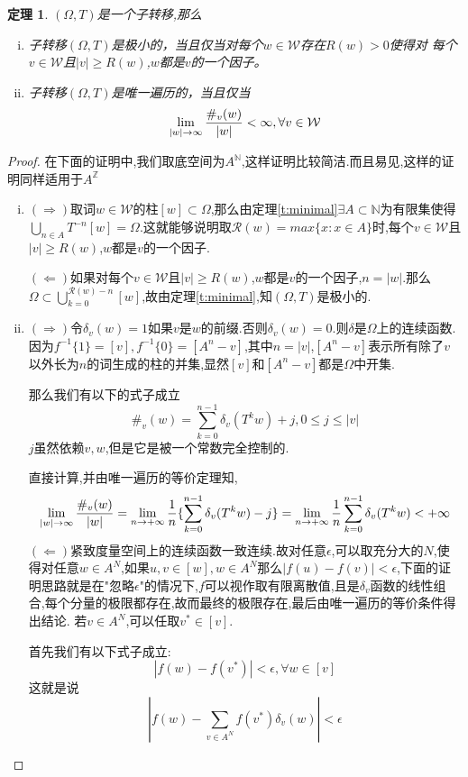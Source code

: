 \documentclass[a4paper,11pt,oneside]{book}
\newtheorem{theorem}{\textbf{\hspace{0.7cm}定理}}[section]
\begin{document}
\begin{theorem}
\label{t:subshift}
$(\Omega,T)$是一个子转移,那么
\begin{enumerate}[(i)]
\item 子转移$(\Omega,T)$是极小的，当且仅当对每个$w\in \mathcal{W}$存在$R(w)>0$使得对%
每个$v\in \mathcal{W}$且$|v|\geq R(w)$,$w$都是$v$的一个因子。
\item 子转移$(\Omega,T)$是唯一遍历的，当且仅当$$\lim_{|w| \to \infty}{\#_v(w)\over |w |}<\infty, \forall v\in \mathcal{W}$$
\end{enumerate}
\end{theorem}
\begin{proof}
在下面的证明中,我们取底空间为$A^{\mathbb{N}}$,这样证明比较简洁.而且易见,这样的证明同样适用于$A^{\mathbb{Z}}$
\begin{enumerate}[(i)]
\item $(\Rightarrow)$取词$w\in\mathcal{W}$的柱$[w]\subset \Omega$,那么由定理\ref{t:minimal}$\exists A\subset\mathbb{N}$为有限集使得$\bigcup_{n\in A} T^{-n}[w]=\Omega$.这就能够说明取$\mathcal{R}(w)=max\{x:x\in A\}$时,每个$v\in \mathcal{W}$且$|v|\geq R(w)$,$w$都是$v$的一个因子.

$(\Leftarrow)$如果对每个$v\in \mathcal{W}$且$|v|\geq R(w)$,$w$都是$v$的一个因子,$n=|w|$.那么$\Omega\subset \bigcup_{k=0}^{\mathcal{R}(w)-n}[w]$,故由定理\ref{t:minimal},知$(\Omega,T)$是极小的.
\item $(\Rightarrow)$令$\delta_v(w)=1$如果$v$是$w$的前缀.否则$\delta_v(w)=0$.则$\delta$是$\Omega$上的连续函数.因为$f^{-1}\{1\}=[v],f^{-1}\{0\}=[A^{n}-v]$,其中$n=|v|$,$[A^{n}-v]$表示所有除了$v$以外长为$n$的词生成的柱的并集,显然$[v]$和$[A^{n}-v]$都是$\Omega$中开集.

那么我们有以下的式子成立$$\#_v(w)=\sum_{k=0}^{n-1}\delta_v(T^kw)+j,0\leq j\leq |v|$$
$j$虽然依赖$v,w$,但是它是被一个常数完全控制的.

直接计算,并由唯一遍历的等价定理知,
$$
\lim_{|w| \to \infty}{\#_v(w)\over |w |}=\lim_{n\to +\infty}\frac{1}{n}\{\sum_{k=0}^{n-1}\delta_v(T^kw)-j\}=\lim_{n\to +\infty}\frac{1}{n}\sum_{k=0}^{n-1}\delta_v(T^kw)<+\infty
$$
$(\Leftarrow)$紧致度量空间上的连续函数一致连续.故对任意$\epsilon$,可以取充分大的$N$,使得对任意$w\in A^{N}$,如果$u,v\in [w],w\in A^{N}$那么$|f(u)-f(v)|<\epsilon$,下面的证明思路就是在"忽略$\epsilon$"的情况下,$f$可以视作取有限离散值,且是$\delta_v$函数的线性组合,每个分量的极限都存在,故而最终的极限存在,最后由唯一遍历的等价条件得出结论.
若$v\in A^N$,可以任取$v^*\in [v]$.

首先我们有以下式子成立:
$$|f(w)-f(v^*)|<\epsilon,\forall w\in [v]$$
这就是说$$|f(w)-\sum_{v\in A^N}f(v^*)\delta_v(w)|<\epsilon$$


\end{enumerate}
\end{proof}
\end{document}
